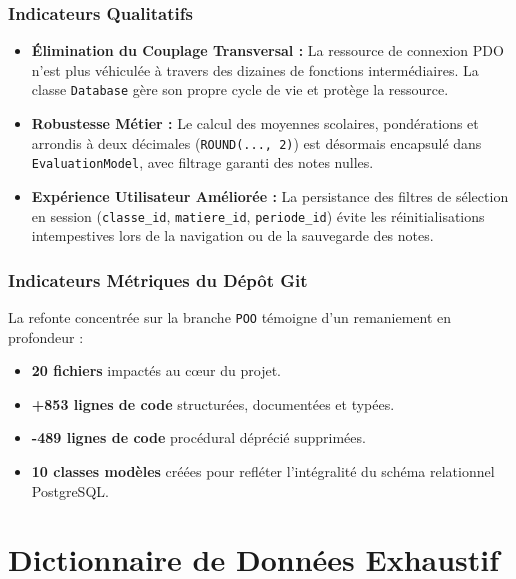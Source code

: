 \documentclass[11pt,a4paper,oneside]{report}
\begin{document}
\subsection{Indicateurs Qualitatifs}
\begin{itemize}[label=\textcolor{primaryMed}{\textbullet}]
    \item \textbf{Élimination du Couplage Transversal :} La ressource de connexion PDO n'est plus véhiculée à travers des dizaines de fonctions intermédiaires. La classe \texttt{Database} gère son propre cycle de vie et protège la ressource.
    \item \textbf{Robustesse Métier :} Le calcul des moyennes scolaires, pondérations et arrondis à deux décimales (\texttt{ROUND(..., 2)}) est désormais encapsulé dans \texttt{EvaluationModel}, avec filtrage garanti des notes nulles.
    \item \textbf{Expérience Utilisateur Améliorée :} La persistance des filtres de sélection en session (\texttt{classe\_id}, \texttt{matiere\_id}, \texttt{periode\_id}) évite les réinitialisations intempestives lors de la navigation ou de la sauvegarde des notes.
\end{itemize}

\subsection{Indicateurs Métriques du Dépôt Git}
La refonte concentrée sur la branche \texttt{POO} témoigne d'un remaniement en profondeur :
\begin{itemize}
    \item \textbf{20 fichiers} impactés au c{\oe}ur du projet.
    \item \textbf{+853 lignes de code} structurées, documentées et typées.
    \item \textbf{-489 lignes de code} procédural déprécié supprimées.
    \item \textbf{10 classes modèles} créées pour refléter l'intégralité du schéma relationnel PostgreSQL.
\end{itemize}

\appendix

\chapter{Dictionnaire de Données Exhaustif}
\label{anx:dictionnaire}
\end{document}
